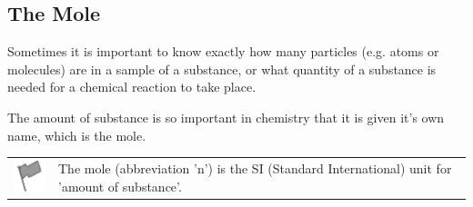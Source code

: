             \subsection{ The Mole}
            \nopagebreak
      \label{m38717*id275573}Sometimes it is important to know exactly how many particles (e.g. atoms or molecules) are in a sample of a substance, or what quantity of a substance is needed for a chemical reaction to take place.\par 
\label{m38717*eip-872}The amount of substance is so important in chemistry that it is given it's own name, which is the mole.  \par \label{m38717*fhsst!!!underscore!!!id119}\begin{definition}
	  \begin{tabular*}{15 cm}{m{15 mm}m{}}
	\hspace*{-50pt}  \includegraphics[width=0.5in]{col11305.imgs/psflag2.png}   & \Definition{   \label{id2496528}\textbf{ Mole }} { \label{m38717*meaningfhsst!!!underscore!!!id119}
      \label{m38717*id275969}The mole (abbreviation 'n') is the SI (Standard International) unit for 'amount of substance'. \par 
       } 
      \end{tabular*}
      \end{definition}
